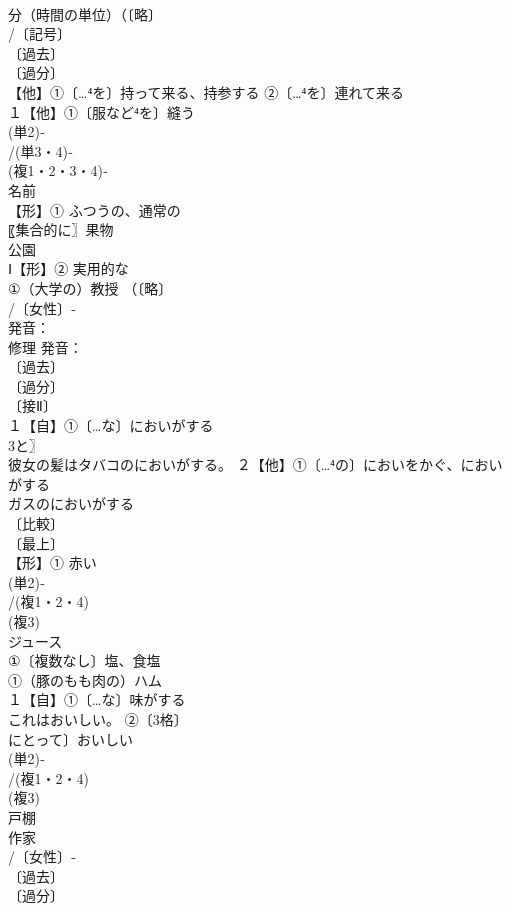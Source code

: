 \documentclass[8pt]{extreport}
\begin{document}
\begin{CJK}{UTF8}{min}
\\	分（時間の単位）（〔略〕
\\	/〔記号〕
\\	〔過去〕
\\	〔過分〕
\\	【他】①〔…⁴を〕持って来る、持参する ②〔…⁴を〕連れて来る
\\	１【他】①〔服など⁴を〕縫う 
\\	(単2)‐
\\	/(単3・4)‐
\\	(複1・2・3・4)‐
\\	名前 
\\	【形】① ふつうの、通常の
\\	〖集合的に〗果物 
\\	公園 
\\	Ⅰ【形】② 実用的な
\\	①（大学の）教授 （〔略〕
\\	/〔女性〕‐
\\	発音：
\\	修理 発音：
\\	〔過去〕
\\	〔過分〕
\\	〔接Ⅱ〕
\\	１【自】①〔…な〕においがする 
\\	3と〗
\\	彼女の髪はタバコのにおいがする。 ２【他】①〔…⁴の〕においをかぐ、においがする 
\\	ガスのにおいがする
\\	〔比較〕
\\	〔最上〕
\\	【形】① 赤い 
\\	(単2)‐
\\	/(複1・2・4)
\\	(複3)
\\	ジュース 
\\	①〔複数なし〕塩、食塩 
\\	①（豚のもも肉の）ハム
\\	１【自】①〔…な〕味がする
\\	これはおいしい。 ②〔3格〕
\\	にとって〕おいしい
\\	(単2)‐
\\	/(複1・2・4)
\\	(複3)
\\	戸棚
\\	作家 
\\	/〔女性〕‐
\\	〔過去〕
\\	〔過分〕

\end{CJK}
\end{document}
